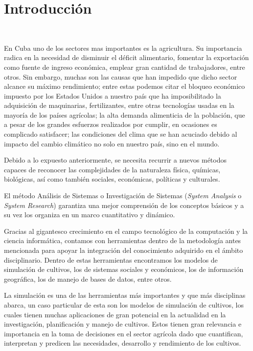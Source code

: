 \chapter*{Introducción}\label{chapter:introduction}
\

En Cuba uno de los sectores mas importantes es la agricultura. Su importancia radica en la necesidad de disminuir el déficit alimentario, fomentar la exportación como fuente de ingreso económica, emplear gran cantidad de trabajadores, entre otros. Sin embargo, muchas son las causas que han impedido que dicho sector alcance su máximo rendimiento; entre estas podemos citar el bloqueo económico impuesto por los Estados Unidos a nuestro país que ha imposibilitado la adquisición de maquinarias, fertilizantes, entre otras tecnologías usadas en la mayoría de los países agrícolas; la alta demanda alimenticia de la población, que a pesar de los grandes esfuerzos realizados por cumplir, en ocasiones es complicado satisfacer; las condiciones del clima que se han acuciado debido al impacto del cambio climático no solo en nuestro país, sino en el mundo.

Debido a lo expuesto anteriormente, se necesita recurrir a nuevos métodos capaces de reconocer las complejidades de la naturaleza física, químicas, biológicas, así como también sociales, económicas, políticas y culturales.

El método Análisis de Sistemas o Investigación de Sistemas (\textit{System Analysis} o \textit{System Research}) garantiza una mejor comprensión de los conceptos básicos y a su vez los organiza en un marco cuantitativo y dinámico.

Gracias al gigantesco crecimiento en el campo tecnológico de la computación y la ciencia informática, contamos con herramientas dentro de la metodología antes mencionada para apoyar la integración del conocimiento adquirido en el ámbito disciplinario. Dentro de estas herramientas encontramos los modelos de simulación de cultivos, los de sistemas sociales y económicos, los de información geográfica, los de manejo de bases de datos, entre otros.

La simulación es una de las herramientas más importantes y que más disciplinas abarca, un caso particular de esta son los modelos de simulación de cultivos, los cuales tienen muchas aplicaciones de gran potencial en la actualidad en la investigación, planificación y manejo de cultivos. Estos tienen gran relevancia e importancia en la toma de decisiones en el sector agrícola dado que cuantifican, interpretan y predicen las necesidades, desarrollo y rendimiento de los cultivos.

